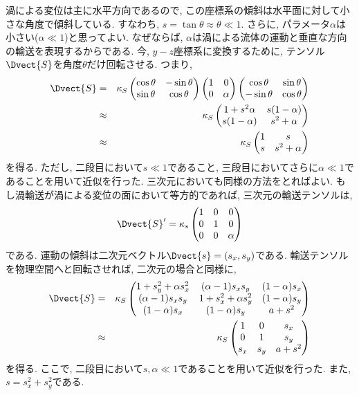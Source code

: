 渦による変位は主に水平方向であるので, この座標系の傾斜は水平面に対して小さな角度で傾斜している. 
すなわち, $s = \tan \theta \approx \theta \ll 1$. 
さらに, パラメータ$\alpha$は小さい($\alpha \ll 1$)と思ってよい. 
なぜならば, $\alpha$は渦による流体の運動と垂直な方向の輸送を表現するからである. 
今, $y-z$座標系に変換するために, テンソル$\Dvect{S}$を角度$\theta$だけ回転させる. 
つまり, 
\begin{eqnarray}
  \Dvect{S} &=& \kappa_S
\begin{pmatrix}
  \cos\theta &-\sin\theta \\
  \sin\theta &\cos\theta
\end{pmatrix}
\begin{pmatrix}
  1 &0 \\
  0 &\alpha
\end{pmatrix}
\begin{pmatrix}
  \cos\theta &\sin\theta \\
  -\sin\theta &\cos\theta
\end{pmatrix}
\\
 &\approx& \kappa_S
\begin{pmatrix}
 1+s^2 \alpha &s(1-\alpha) \\
 s(1-\alpha)  &s^2 + \alpha
\end{pmatrix} 
\\
 &\approx& \kappa_S
\begin{pmatrix}
  1 &s \\
  s &s^2+\alpha
\end{pmatrix}
\end{eqnarray}%
%
を得る. 
ただし, 二段目において$s \ll 1$であること, 
三段目においてさらに$\alpha \ll 1$であることを用いて近似を行った. 
三次元においても同様の方法をとればよい. 
もし渦輸送が渦による変位の面において等方的であれば, 三次元の輸送テンソルは, 
\begin{equation}
  \Dvect{S}' = \kappa_s
\begin{pmatrix}
    1 &0 &0 \\
    0 &1 &0 \\
    0 &0 &\alpha 
  \end{pmatrix}
\end{equation}
である. 
運動の傾斜は二次元ベクトル$\Dvect{s} = (s_x,s_y)$である. 
輸送テンソルを物理空間へと回転させれば, 二次元の場合と同様に, 
\begin{eqnarray}
\Dvect{S} &=& \kappa_S 
\begin{pmatrix}
  1+s_y^2 + \alpha s_x^2 &(\alpha-1) s_x s_y   &(1-\alpha)s_x \\
  (\alpha-1) s_x s_y     &1+s_x^2+\alpha s_y^2 &(1-\alpha)s_y \\
  (1-\alpha)s_x          &(1-\alpha)s_y        &a + s^2
\end{pmatrix} 
\\
 &\approx& \kappa_S
\begin{pmatrix}
  1     &0       &s_x \\
  0     &1       &s_y \\
  s_x   &s_y     &a + s^2
\end{pmatrix} 
\end{eqnarray}
を得る. 
ここで, 二段目において$s,\alpha \ll 1$であることを用いて近似を行った. 
また, $s=s_x^2 + s_y^2$である. 


